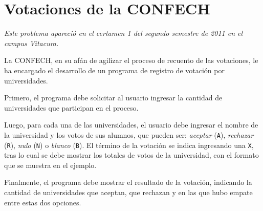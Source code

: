 \section{Votaciones de la CONFECH}

\emph{Este problema apareció en el certamen 1 del segundo semestre de
2011 en el campus Vitacura.}

La CONFECH, en su afán de agilizar el proceso de recuento de las
votaciones, le ha encargado el desarrollo de un programa de registro de
votación por universidades.

Primero, el programa debe solicitar al usuario ingresar la cantidad de
universidades que participan en el proceso.

Luego, para cada una de las universidades, el usuario debe ingresar el
nombre de la universidad y los votos de sus alumnos, que pueden ser:
\emph{aceptar} (\lstinline!A!), \emph{rechazar} (\lstinline!R!),
\emph{nulo} (\lstinline!N!) o \emph{blanco} (\lstinline!B!). El término
de la votación se indica ingresando una \lstinline!X!, tras lo cual se
debe mostrar los totales de votos de la universidad, con el formato que
se muestra en el ejemplo.

Finalmente, el programa debe mostrar el resultado de la votación,
indicando la cantidad de universidades que aceptan, que rechazan y en
las que hubo empate entre estas dos opciones.
